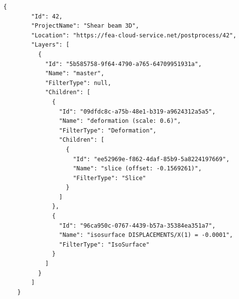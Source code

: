 \begin{lstlisting}[style=json,caption=Example of solution.json document.,label=lst:solution.json]
    {
        "Id": 42,
        "ProjectName": "Shear beam 3D",
        "Location": "https://fea-cloud-service.net/postprocess/42",
        "Layers": [
          {
            "Id": "5b585758-9f64-4790-a765-64709951931a",
            "Name": "master",
            "FilterType": null,
            "Children": [
              {
                "Id": "09dfdc8c-a75b-48e1-b319-a9624312a5a5",
                "Name": "deformation (scale: 0.6)",
                "FilterType": "Deformation",
                "Children": [
                  {
                    "Id": "ee52969e-f862-4daf-85b9-5a8224197669",
                    "Name": "slice (offset: -0.1569261)",
                    "FilterType": "Slice"
                  }
                ]
              },
              {
                "Id": "96ca950c-0767-4439-b57a-35384ea351a7",
                "Name": "isosurface DISPLACEMENTS/X(1) = -0.0001",
                "FilterType": "IsoSurface"
              }
            ]
          }
        ]
    }
    \end{lstlisting}


